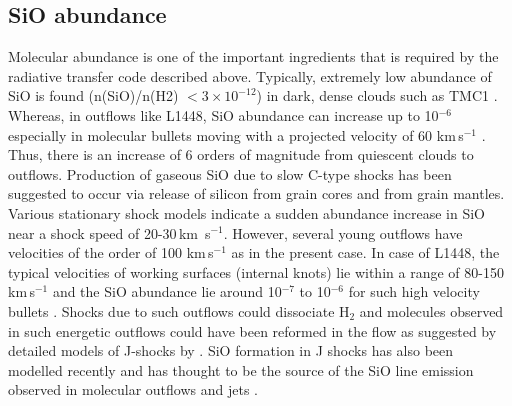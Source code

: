 \documentclass[useAMS,usenatbib]{mn2e}
\begin{document}
\subsection{SiO abundance}
\label{ssec:sioabun}
Molecular abundance is one of the important ingredients that is
required by the radiative transfer code described above. 
Typically, extremely low abundance of SiO is
found (n(SiO)/n(H2) $< 3\times10^{-12}$) in dark, dense clouds such
as TMC1 \citep{Ziurys:1989p14699,MartinPintado:1992p14309}. Whereas, in
outflows like L1448, SiO abundance can increase up to 10$^{-6}$ especially in
molecular bullets moving with a projected velocity of 60
km\,s$^{-1}$ \citep{MartinPintado:1992p14309, Dutrey:1997p11185}. Thus, there is
an increase of 6 orders of magnitude from quiescent clouds
to outflows. Production of
gaseous SiO due to slow C-type shocks has been suggested to occur via release of
silicon from grain cores and from grain mantles. Various stationary
shock models indicate a sudden abundance increase in SiO 
near a shock speed of 20-30\,km\, s$^{-1}$. However, several young
outflows have velocities of the order of 100 km\,s$^{-1}$ as in the present
case. In case of L1448, the typical velocities of working surfaces (internal knots) 
lie within a range of 80-150 km\,s$^{-1}$ and the SiO abundance 
lie around 10$^{-7}$ to 10$^{-6}$ for such high velocity bullets \citep{Dutrey:1997p11185}. 
Shocks due to such outflows could dissociate H$_{2}$ and molecules observed in such
energetic outflows could have been reformed in the flow as suggested by
detailed models of J-shocks by \cite{Neufeld:1989p14322}. SiO formation in J shocks
has also been modelled recently and has thought to be the source of
the SiO line emission observed in molecular outflows and jets
\citep{Guillet:2009p11229}.
%
\end{document}
